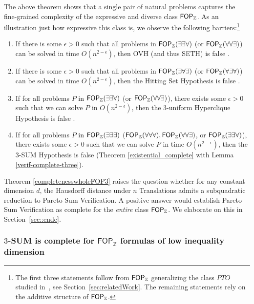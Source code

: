 The above theorem shows that a single pair of natural problems captures the fine-grained complexity of the expressive and diverse class $\mathsf{FOP}_{\mathbb{Z}}$. As an illustration just how expressive this class is, we observe the following barriers:\footnote{The first three statements follow from $\mathsf{FOP}_{\mathbb{Z}}$ generalizing the class $PTO$ studied in~\cite{DBLP:journals/algorithmica/AnGIJKN22}, see Section~\ref{sec:relatedWork}. The remaining statements rely on the additive structure of $\mathsf{FOP}_{\mathbb{Z}}$.}
\begin{enumerate}
	\item If there is some $\epsilon >0$ such that all problems in $\mathsf{FOP}_{\mathbb{Z}}(\exists \exists \forall)$ (or $\mathsf{FOP}_{\mathbb{Z}}(\forall \forall \exists)$) can be solved in time $O(n^{2-\epsilon})$, then OVH (and thus SETH) is false \cite[Theorem 16]{DBLP:journals/algorithmica/AnGIJKN22}.
	\item If there is some $\epsilon >0$ such that all problems in $\mathsf{FOP}_{\mathbb{Z}}(\exists \forall \exists)$ (or $\mathsf{FOP}_{\mathbb{Z}}(\forall \exists \forall)$) can be solved in time $O(n^{2-\epsilon})$, then the Hitting Set Hypothesis is false \cite[Theorem 12]{DBLP:journals/algorithmica/AnGIJKN22}.
	\item If for all problems $P$ in $\mathsf{FOP}_{\mathbb{Z}}(\exists \exists \forall)$ (or $\mathsf{FOP}_{\mathbb{Z}}(\forall \forall \exists)$), there exists some $\epsilon>0$ such that we can solve $P$ in  $O(n^{2-\epsilon})$, then the 3-uniform Hyperclique Hypothesis is false \cite[Theorem 15]{DBLP:journals/algorithmica/AnGIJKN22}.
	\item If for all problems $P$ in $\mathsf{FOP}_{\mathbb{Z}}(\exists \exists \exists)$ ($\mathsf{FOP}_{\mathbb{Z}}(\forall \forall \forall), \mathsf{FOP}_{\mathbb{Z}}(\forall \forall \exists)$, or $\mathsf{FOP}_{\mathbb{Z}}(\exists \exists \forall)$), there exists some $\epsilon>0$ such that we can solve $P$ in time $O(n^{2-\epsilon})$, then the $3$-SUM Hypothesis is false (Theorem \ref{existential_complete} with Lemma \ref{verif-complete-three}).
\end{enumerate}
Theorem \ref{completenesswholeFOP3} raises the question whether for any constant dimension $d$, the Hausdorff distance under $n$ Translations admits a subquadratic reduction to Pareto Sum Verification. A positive answer would establish Pareto Sum Verification as complete for the \emph{entire} class $\mathsf{FOP}_{\mathbb{Z}}$. We elaborate on this in Section~\ref{sec::ende}.
 


\subsubsection{$3$-SUM is complete for $\mathsf{FOP}_{\mathbb{Z}}$ formulas of low inequality dimension}

